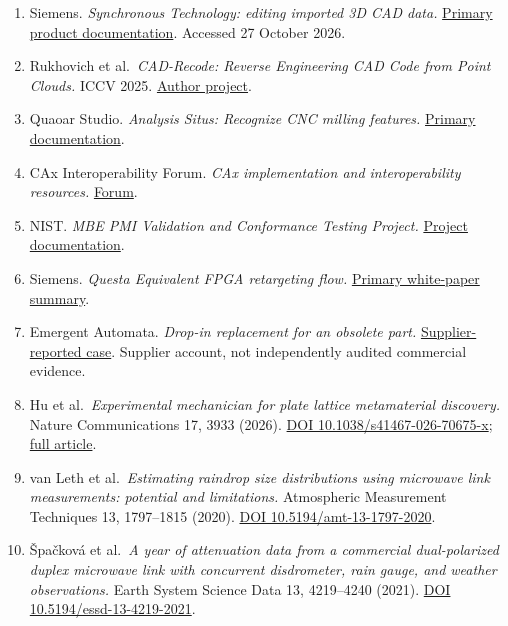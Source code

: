 \documentclass[11pt,letterpaper]{article}
\providecommand{\tightlist}{\setlength{\itemsep}{2pt}\setlength{\parskip}{0pt}}
\begin{document}
\begin{enumerate}
\def\labelenumi{\arabic{enumi}.}
\tightlist
\item
  Siemens. \emph{Synchronous Technology: editing imported 3D CAD data.} \href{https://solidedge.siemens.com/en/solutions/products/3d-design/synchronous-technology/}{Primary product documentation}. Accessed 27 October 2026.
\item
  Rukhovich et al.~\emph{CAD-Recode: Reverse Engineering CAD Code from Point Clouds.} ICCV 2025. \href{https://cad-recode.github.io/}{Author project}.
\item
  Quaoar Studio. \emph{Analysis Situs: Recognize CNC milling features.} \href{https://www.analysissitus.org/features/features_recognize-cnc-milling-features.html}{Primary documentation}.
\item
  CAx Interoperability Forum. \emph{CAx implementation and interoperability resources.} \href{https://www.mbx-if.org/home/cax/}{Forum}.
\item
  NIST. \emph{MBE PMI Validation and Conformance Testing Project.} \href{https://www.nist.gov/ctl/smart-connected-systems-division/smart-connected-manufacturing-systems-group/mbe-pmi-validation}{Project documentation}.
\item
  Siemens. \emph{Questa Equivalent FPGA retargeting flow.} \href{https://resources.sw.siemens.com/en-GB/white-paper-questa-equivalent-fpga-retargeting-flow/}{Primary white-paper summary}.
\item
  Emergent Automata. \emph{Drop-in replacement for an obsolete part.} \href{https://www.emergentautomata.com/obsolete-part-replacement}{Supplier-reported case}. Supplier account, not independently audited commercial evidence.
\item
  Hu et al.~\emph{Experimental mechanician for plate lattice metamaterial discovery.} Nature Communications 17, 3933 (2026). \href{https://doi.org/10.1038/s41467-026-70675-x}{DOI 10.1038/s41467-026-70675-x}; \href{https://pmc.ncbi.nlm.nih.gov/articles/PMC13128949/}{full article}.
\item
  van Leth et al.~\emph{Estimating raindrop size distributions using microwave link measurements: potential and limitations.} Atmospheric Measurement Techniques 13, 1797--1815 (2020). \href{https://doi.org/10.5194/amt-13-1797-2020}{DOI 10.5194/amt-13-1797-2020}.
\item
  Špačková et al.~\emph{A year of attenuation data from a commercial dual-polarized duplex microwave link with concurrent disdrometer, rain gauge, and weather observations.} Earth System Science Data 13, 4219--4240 (2021). \href{https://doi.org/10.5194/essd-13-4219-2021}{DOI 10.5194/essd-13-4219-2021}.

\end{enumerate}
\end{document}
